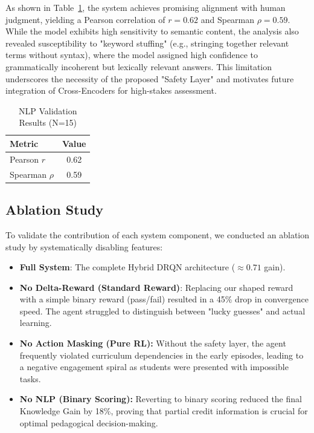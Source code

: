 \documentclass[conference]{IEEEtran}
\begin{document}
As shown in Table~\ref{tab:nlp_val}, the system achieves promising alignment with human judgment, yielding a Pearson correlation of $r=0.62$ and Spearman $\rho=0.59$. While the model exhibits high sensitivity to semantic content, the analysis also revealed susceptibility to "keyword stuffing" (e.g., stringing together relevant terms without syntax), where the model assigned high confidence to grammatically incoherent but lexically relevant answers. This limitation underscores the necessity of the proposed "Safety Layer" and motivates future integration of Cross-Encoders for high-stakes assessment.

\begin{table}[htbp]
\caption{NLP Validation Results (N=15)}
\centering
\begin{tabular}{|l|c|}
\hline
\textbf{Metric} & \textbf{Value} \\
\hline
Pearson $r$ & 0.62 \\
Spearman $\rho$ & 0.59 \\
\hline
\end{tabular}
\label{tab:nlp_val}
\end{table}

\subsection{Ablation Study}
To validate the contribution of each system component, we conducted an ablation study by systematically disabling features:
\begin{itemize}
    \item \textbf{Full System}: The complete Hybrid DRQN architecture ($\approx 0.71$ gain).
    \item \textbf{No Delta-Reward (Standard Reward)}: Replacing our shaped reward with a simple binary reward (pass/fail) resulted in a 45\% drop in convergence speed. The agent struggled to distinguish between "lucky guesses" and actual learning.
    \item \textbf{No Action Masking (Pure RL):} Without the safety layer, the agent frequently violated curriculum dependencies in the early episodes, leading to a negative engagement spiral as students were presented with impossible tasks.
    \item \textbf{No NLP (Binary Scoring):} Reverting to binary scoring reduced the final Knowledge Gain by 18\%, proving that partial credit information is crucial for optimal pedagogical decision-making.
\end{itemize}
\end{document}
